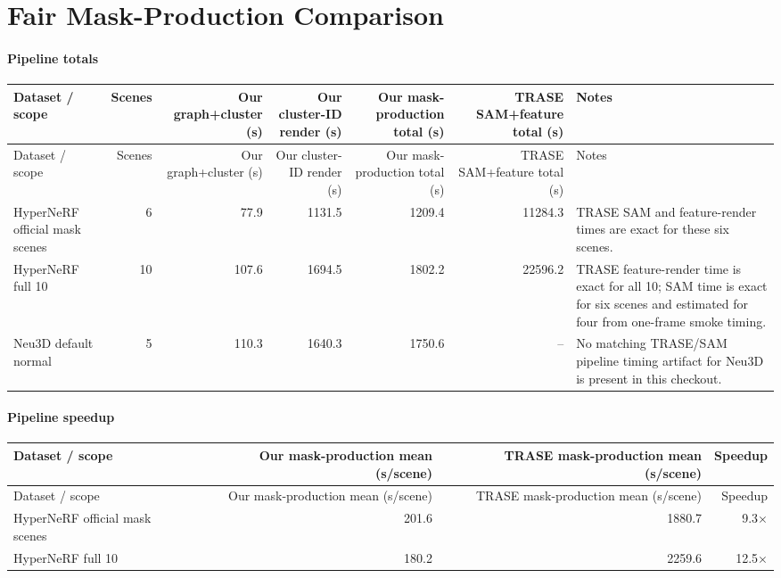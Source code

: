 \documentclass[10pt]{article}
\begin{document}
\section{Fair Mask-Production Comparison}
\paragraph{Pipeline totals}
\small
\begin{longtable}{lrrrrrp{5.2cm}}
\toprule
Dataset / scope & Scenes & Our graph+cluster (s) & Our cluster-ID render (s) & Our mask-production total (s) & TRASE SAM+feature total (s) & Notes \\
\midrule
\endfirsthead
\toprule
Dataset / scope & Scenes & Our graph+cluster (s) & Our cluster-ID render (s) & Our mask-production total (s) & TRASE SAM+feature total (s) & Notes \\
\midrule
\endhead
HyperNeRF official mask scenes & 6 & 77.9 & 1131.5 & 1209.4 & 11284.3 & TRASE SAM and feature-render times are exact for these six scenes. \\
HyperNeRF full 10 & 10 & 107.6 & 1694.5 & 1802.2 & 22596.2 & TRASE feature-render time is exact for all 10; SAM time is exact for six scenes and estimated for four from one-frame smoke timing. \\
Neu3D default normal & 5 & 110.3 & 1640.3 & 1750.6 & -- & No matching TRASE/SAM pipeline timing artifact for Neu3D is present in this checkout. \\
\bottomrule
\end{longtable}
\normalsize

\paragraph{Pipeline speedup}
\small
\begin{longtable}{lrrr}
\toprule
Dataset / scope & Our mask-production mean (s/scene) & TRASE mask-production mean (s/scene) & Speedup \\
\midrule
\endfirsthead
\toprule
Dataset / scope & Our mask-production mean (s/scene) & TRASE mask-production mean (s/scene) & Speedup \\
\midrule
\endhead
HyperNeRF official mask scenes & 201.6 & 1880.7 & 9.3$\times$ \\
HyperNeRF full 10 & 180.2 & 2259.6 & 12.5$\times$ \\
\bottomrule
\end{longtable}
\normalsize
\end{document}
